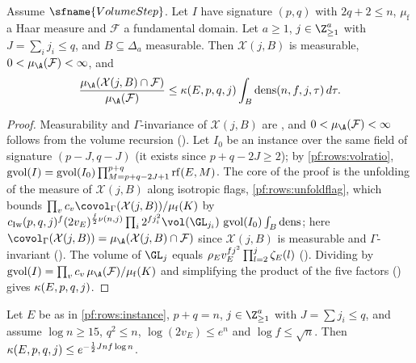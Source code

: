 \begin{proposition}\label{pf:rows:flagmeasure}
Assume $\sfname{VolumeStep}$. Let $I$ have signature $(p,q)$ with $2q+2\le n$, $\mu_{\mathrm f}$ a Haar measure and
$\mathcal F$ a fundamental domain. Let $a\ge1$, $j\in\Z_{\ge1}^a$ with $J=\sum_ij_i\le q$, and $B\subseteq\Delta_a$
measurable. Then $\mathcal X(j,B)$ is measurable, $0<\mu_{\A}(\mathcal F)<\infty$, and
\[
\frac{\mu_{\A}(\mathcal X(j,B)\cap\mathcal F)}{\mu_{\A}(\mathcal F)}\le\rowskap(E,p,q,j)\int_B\rowsdens(n,f,j,\tau)\,d\tau .
\]
\end{proposition}

\begin{proof}
Measurability and $\Gamma$-invariance of $\mathcal X(j,B)$ are
, and $0<\mu_{\A}(\mathcal F)<\infty$ follows from
the volume recursion (). Let $I_0$ be an instance
over the same field of signature $(p-J,q-J)$ (it exists since $p+q-2J\ge2$); by \cref{pf:rows:volratio},
$\operatorname{gvol}(I)=\operatorname{gvol}(I_0)\prod_{M=p+q-2J+1}^{p+q}\operatorname{rf}(E,M)$. The core of the proof is the unfolding of the
measure of $\mathcal X(j,B)$ along isotropic flags, \cref{pf:rows:unfoldflag}, which bounds
$\prod_vc_v\covol_\Gamma(\mathcal X(j,B))/\mu_{\mathrm f}(K)$ by
$c_{\mathrm{Iw}}(p,q,j)^f(2v_E)^{\frac f2\rowsdimN(n,j)}\prod_i2^{fj_i^2}\vol(\GL_{j_i})\,\rowsgv(I_0)\int_B\rowsdens$; here
$\covol_\Gamma(\mathcal X(j,B))=\mu_{\A}(\mathcal X(j,B)\cap\mathcal F)$ since $\mathcal X(j,B)$ is measurable and $\Gamma$-invariant
().
The volume of $\GL_j$ equals $\rho_E v_E^{fj^2}\prod_{l=2}^j\zeta_E(l)$
(). Dividing by $\rowsgv(I)=\prod_vc_v\,\mu_{\A}(\mathcal F)/\mu_{\mathrm f}(K)$
and simplifying the product of the five factors () gives
$\kappa(E,p,q,j)$.
\end{proof}

\begin{lemma}\label{pf:rows:kappa}
Let $E$ be as in \cref{pf:rows:instance}, $p+q=n$, $j\in\Z_{\ge1}^a$ with $J=\sum j_i\le q$, and assume $\log n\ge15$,
$q^2\le n$, $\log(2v_E)\le e^n$ and $\log f\le\sqrt n$. Then $\kappa(E,p,q,j)\le e^{-\frac12Jnf\log n}$.
\end{lemma}

